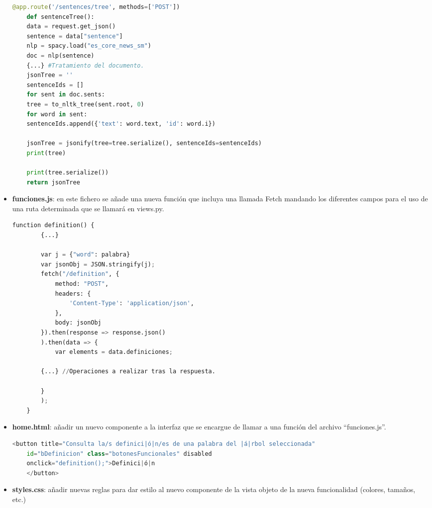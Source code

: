 \begin{itemize}
\begin{lstlisting}[language=python,firstnumber=1]
	@app.route('/sentences/tree', methods=['POST'])
	def sentenceTree():
	data = request.get_json()
	sentence = data["sentence"]
	nlp = spacy.load("es_core_news_sm")
	doc = nlp(sentence) 
	{...} #Tratamiento del documento.
	jsonTree = ''
	sentenceIds = []
	for sent in doc.sents:
	tree = to_nltk_tree(sent.root, 0)
	for word in sent:
	sentenceIds.append({'text': word.text, 'id': word.i})
		
	jsonTree = jsonify(tree=tree.serialize(), sentenceIds=sentenceIds)
	print(tree)
	
	print(tree.serialize())
	return jsonTree

\end{lstlisting}

	
	\item \textbf{funciones.js}: en este fichero se añade una nueva función que incluya una llamada Fetch mandando los diferentes campos para el uso de una ruta determinada que se llamará en views.py. 
	
	\begin{lstlisting}[language=python,firstnumber=1]
	function definition() {
		{...}
		
		var j = {"word": palabra}
		var jsonObj = JSON.stringify(j);
		fetch("/definition", {
			method: "POST",
			headers: {
				'Content-Type': 'application/json',
			},
			body: jsonObj
		}).then(response => response.json()
		).then(data => {
			var elements = data.definiciones;
			
		{...} //Operaciones a realizar tras la respuesta.
			
		}
		);		
	}
	\end{lstlisting}
	
	
	
	
	
	\item \textbf{home.html}: añadir un nuevo componente a la interfaz que se encargue de llamar a una función del archivo ``funciones.js''. 
		\begin{lstlisting}[language=python,firstnumber=1]
	<button title="Consulta la/s definici|ó|n/es de una palabra del |á|rbol seleccionada"
	id="bDefinicion" class="botonesFuncionales" disabled
	onclick="definition();">Definici|ó|n
	</button>
	\end{lstlisting}
	\item \textbf{styles.css}: añadir nuevas reglas para dar estilo al nuevo componente de la vista objeto de la nueva funcionalidad (colores, tamaños, etc.)
\end{itemize}
